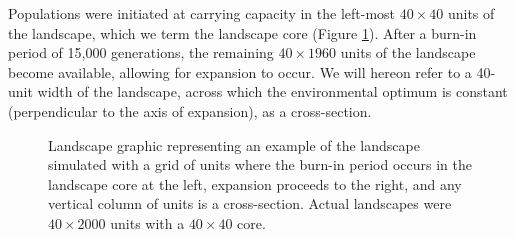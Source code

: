 
Populations were initiated at carrying capacity in the left-most $40\times40$ units of the landscape, which we term the landscape core (Figure \ref{fig:landscape}). After a burn-in period of 15,000 generations, the remaining $40\times1960$ units of the landscape become available, allowing for expansion to occur. We will hereon refer to a 40-unit width of the landscape, across which the environmental optimum is constant (perpendicular to the axis of expansion), as a cross-section.

\begin{figure}[h]
\centering
{}
\caption[Landscape graphic.]{Landscape graphic representing an example of the landscape simulated with a grid of units where the burn-in period occurs in the landscape core at the left, expansion proceeds to the right, and any vertical column of units is a cross-section. Actual landscapes were $40\times2000$ units with a $40\times40$ core.}
\label{fig:landscape}
\end{figure}


